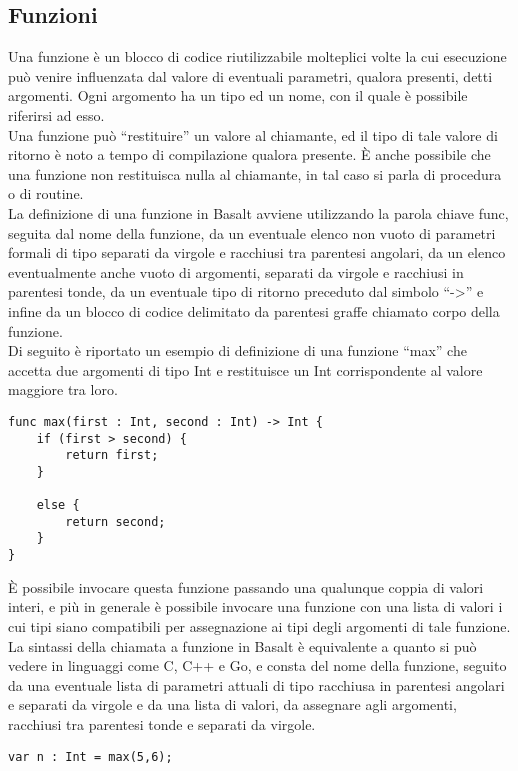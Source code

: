 \subsection{Funzioni}
Una funzione è un blocco di codice riutilizzabile molteplici volte la cui esecuzione può venire 
influenzata dal valore di eventuali parametri, qualora presenti, detti argomenti. Ogni argomento 
ha un tipo ed un nome, con il quale è possibile riferirsi ad esso. \\

Una funzione può “restituire” un valore al chiamante, ed il tipo di tale valore di ritorno 
è noto a tempo di compilazione qualora presente. È anche possibile che una funzione 
non restituisca nulla al chiamante, in tal caso si parla di procedura o di routine. \\

La definizione di una funzione in Basalt avviene utilizzando la parola chiave func, seguita 
dal nome della funzione, da un eventuale elenco non vuoto di parametri 
formali di tipo separati da virgole e racchiusi tra parentesi angolari, 
da un elenco eventualmente anche vuoto di argomenti, separati da virgole e 
racchiusi in parentesi tonde, da un eventuale tipo di ritorno preceduto 
dal simbolo “->” e infine da un blocco di codice delimitato da parentesi graffe 
chiamato corpo della funzione. \\ 

Di seguito è riportato un esempio di definizione di una funzione “max” che accetta 
due argomenti di tipo Int e restituisce un Int corrispondente al valore maggiore tra loro.

\vspace{0.5cm}
\begin{lstlisting}[frame=single]
func max(first : Int, second : Int) -> Int {
    if (first > second) {
        return first; 
    }
    
    else {
        return second;
    }
}
\end{lstlisting}
\vspace{0.5cm}

È possibile invocare questa funzione passando una qualunque coppia di valori interi, 
e più in generale è possibile invocare una funzione con una lista di valori i cui tipi 
siano compatibili per assegnazione ai tipi degli argomenti di tale funzione. La sintassi 
della chiamata a funzione in Basalt è equivalente a quanto si può vedere in linguaggi 
come C, C++ e Go, e consta del nome della funzione, seguito da una eventuale lista di 
parametri attuali di tipo racchiusa in parentesi angolari e separati da virgole e 
da una lista di valori, da assegnare agli argomenti, racchiusi tra parentesi tonde 
e separati da virgole.

\vspace{0.5cm}
\begin{lstlisting}[frame=single]
var n : Int = max(5,6);
\end{lstlisting}
\vspace{0.5cm}
\newpage



